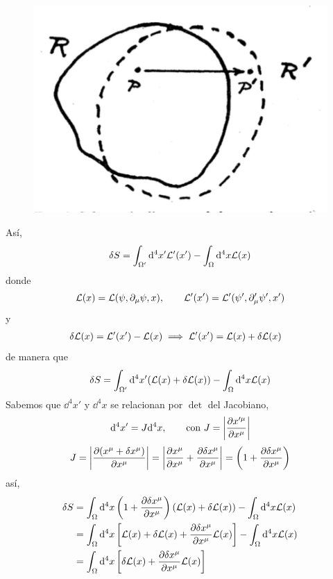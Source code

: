 \begin{figure}[h!]
	\centering
	\includegraphics[scale=.5]{fig/img12.png}
\end{figure}
Así,
\begin{align}
  \delta S&=\int_{\Omega'}\dd^4x'\mathcal{L} '(x')-\int_\Omega \dd^4x \mathcal{L} (x)\\
\end{align}
donde 
\begin{equation}
  \mathcal{L}(x)=\mathcal{L} (\psi,\partial_\mu \psi,x),\qquad \mathcal{L}'(x')=\mathcal{L}' (\psi',\partial'_\mu \psi',x')
\end{equation}
y 
\begin{align}
  \delta\mathcal{L}(x) &=\mathcal{L}'(x')-\mathcal{L} (x)\implies \mathcal{L}'(x')=\mathcal{L}(x)+\delta\mathcal{L} (x)
\end{align}
de manera que
\begin{align}
  \delta S&=\int_{\Omega'}\dd^4x'(\mathcal{L}(x)+\delta\mathcal{L} (x))-\int_\Omega\dd^4x\mathcal{L}(x)\\
\end{align}
Sabemos que $\dd^4x'$ y $\dd^4x$ se relacionan por $\det$ del Jacobiano,
\begin{align}
  \dd^4x'=J\dd^4x, \qquad \text{con } J=\left|\pdv{x'^\mu}{x^\mu} \right|
\end{align}
\begin{align}
  J=\left|\pdv{(x^\mu+\delta x^\mu) }{x^\mu} \right|=\left|\pdv{x^\mu}{x^\mu}+\pdv{\delta x^\mu}{x^\mu}\right|=\left(1+\pdv{\delta x^\mu}{x^\mu}\right)
\end{align}
así,
\begin{align}
  \delta S&=\int_{\Omega}\dd^4x\left(1+\pdv{\delta x^\mu}{x^\mu}\right)(\mathcal{L}(x)+\delta\mathcal{L} (x))-\int_\Omega\dd^4x\mathcal{L}(x)\\
  &=\int_\Omega\dd^4x \left[\mathcal{L}(x)+\delta \mathcal{L}(x)+\pdv{\delta x^\mu}{x^\mu}\mathcal{L} (x)\right]-\int_\Omega\dd^4x\mathcal{L} (x)\\
  &=\int_\Omega\dd^4x\left[\delta\mathcal{L}(x)+\pdv{\delta x^\mu}{x^\mu}\mathcal{L}(x)\right]
\end{align}
